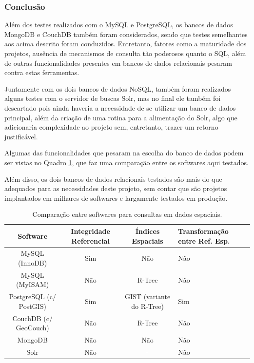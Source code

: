 \documentclass[diss]{template/setrem}
\begin{document}
\subsubsection{Conclusão}
Além dos testes realizados com o MySQL e PostgreSQL, os bancos de dados MongoDB e CouchDB também foram considerados, sendo que testes semelhantes aos acima descrito foram conduzidos. Entretanto, fatores como a maturidade dos projetos, ausência de mecanismos de consulta tão poderosos quanto o SQL, além de outras funcionalidades presentes em bancos de dados relacionais pesaram contra estas ferramentas.

Juntamente com os dois bancos de dados NoSQL, também foram realizados alguns testes com o servidor de buscas Solr, mas no final ele também foi descartado pois ainda haveria a necessidade de se utilizar um banco de dados principal, além da criação de uma rotina para a alimentação do Solr, algo que adicionaria complexidade ao projeto sem, entretanto, trazer um retorno justificável.

Algumas das funcionalidades que pesaram na escolha do banco de dados podem ser vistas no Quadro \ref{tab:db-comparison}, que faz uma comparação entre os softwares aqui testados.

Além disso, os dois bancos de dados relacionais testados são mais do que adequados para as necessidades deste projeto, sem contar que são projetos implantados em milhares de softwares e largamente testados em produção.

\begin{table}[!h]
  \begin{center}
  	\footnotesize
  	\renewcommand{\arraystretch}{1.5}
    \begin{tabular}{ | c | c | c | p{3cm} |}
    \hline
	
	\textbf{Software} & \textbf{Integridade Referencial} & \textbf{Índices Espaciais} & \textbf{Transformação entre Ref. Esp.} \\ \hline
	MySQL (InnoDB) & Sim & Não & Não \\ \hline
	MySQL (MyISAM) & Não & R-Tree & Não \\ \hline
	PostgreSQL (c/ PostGIS) & Sim & GIST (variante do R-Tree) & Sim \\ \hline
	CouchDB (c/ GeoCouch) & Não & R-Tree & Não \\ \hline
	MongoDB & Não & Não & Não \\ \hline
	Solr & Não & - & Não \\ \hline
	
    \hline
    \end{tabular}
  \end{center}
  \caption{Comparação entre softwares para consultas em dados espaciais.}
  \label{tab:db-comparison}
\end{table}
\end{document}
